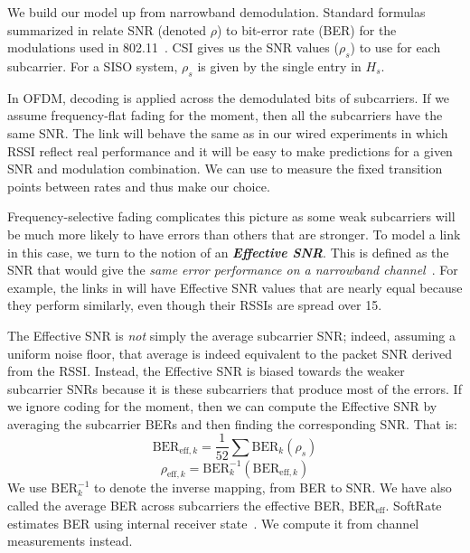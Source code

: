 We build our model up from narrowband demodulation. 
Standard formulas summarized in  relate SNR (denoted $\rho$) to bit-error rate (BER) for the modulations used in 802.11~\cite{Goldsmith}. CSI gives us the SNR values ($\rho_s$) to use for each subcarrier. For a SISO system, $\rho_s$ is given by the single entry in $H_s$.

In OFDM, decoding is applied across the demodulated bits of subcarriers. If we assume frequency-flat fading for the moment, then all the subcarriers have the same SNR\@. The link will behave the same as in our wired experiments in which RSSI reflect real performance and it will be easy to make predictions for a given SNR and modulation combination. We can use  to measure the fixed transition points between rates and thus make our choice.

Frequency-selective fading complicates this picture as some weak subcarriers will be much more likely to have errors than others that are stronger. To model a link in this case, we turn to the notion of an \textbf{\em Effective SNR}. This is defined as the SNR that would give the \emph{same error performance on a narrowband channel}~\cite{nanda_effectiveSNR}. For example, the links in  will have Effective SNR values that are nearly equal because they perform similarly, even though their RSSIs are spread over 15\dB.

The Effective SNR is \emph{not} simply the average subcarrier SNR; indeed, assuming a uniform noise floor, that average is indeed equivalent to the packet SNR derived from the RSSI\@. Instead, the Effective SNR is biased towards the weaker subcarrier SNRs because it is these subcarriers that produce most of the errors. If we ignore coding for the moment, then we can compute the Effective SNR by averaging the subcarrier BERs and then finding the corresponding SNR\@. That is:
\begin{equation}
\label{eq:effective_ber}
	\text{BER}_{\text{eff},k} = \frac{1}{52} \sum \text{BER}_k(\rho_s)
\end{equation}
\begin{equation}
\label{eq:effective_snr}
	\rho_{\text{eff},k} = \text{BER}_k^{-1}(\text{BER}_{\text{eff},k})
\end{equation}
We use $\text{BER}_k^{-1}$ to denote the inverse mapping, from BER to SNR\@. We have also called the average BER across subcarriers the effective BER, $\text{BER}_{\text{eff}}$. SoftRate estimates BER using internal receiver state~\cite{Vutukuru_SoftRate}. We compute it from channel measurements instead.

